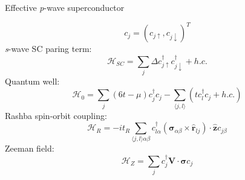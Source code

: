 \documentclass[xcolor=dvipsnames,10pt,aspectratio=169]{beamer}
\let\oldhat\hat
\renewcommand{\hat}[1]{\oldhat{\mathbf{#1}}}
\renewcommand{\vec}[1]{\mathbf{#1}}
\newcommand{\ham}{\mathcal{H}}
\newcommand{\cc}{c^{\dagger}}
\newcommand{\de}{\Delta}
\begin{document}
  \begin{frame}{Effective \textit{p}-wave superconductor}
    \begin{multicols}{2}
      \centering
      \small
      \begin{equation}
        c_j = (c_{j\uparrow}, c_{j\downarrow})^T
      \end{equation}
      \textit{s}-wave SC paring term:
      \begin{equation}
        \ham_{SC} = \sum_j \de \cc_{j\uparrow} \cc_{j\downarrow} + h.c.
      \end{equation}
      Quantum well:
      \begin{equation}
        \ham_0 = \sum_j (6t - \mu) \cc_j c_j - \sum_{\langle j,l \rangle} (t \cc_l c_j + h.c.)
      \end{equation}
      Rashba spin-orbit coupling:
      \begin{equation}
        \ham_R = -it_R \sum_{\langle j,l \rangle \alpha\beta} \cc_{l\alpha} (\bm{\sigma}_{\alpha\beta} \times \hat{r}_{lj}) \cdot \hat{z} c_{j\beta}
      \end{equation}
      Zeeman field:
      \begin{equation}
        \ham_Z = \sum_j \cc_j \vec{V} \cdot \bm{\sigma} c_j
      \end{equation}

    \end{multicols}
  \end{frame}
\end{document}
